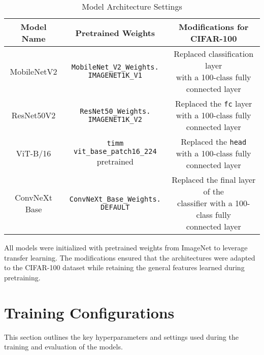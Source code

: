 \begin{table}[h]
    \centering
    \caption{Model Architecture Settings}
    \begin{tabular}{|c|c|c|}
    \hline
    \textbf{Model Name}   & \textbf{Pretrained Weights}            & \textbf{Modifications for CIFAR-100}                     \\ \hline
    MobileNetV2           & \makecell[l]{\texttt{MobileNet\_V2\_Weights.} \\ \texttt{IMAGENET1K\_V1}} 
                          & \makecell[l]{Replaced classification layer \\ with a 100-class fully connected layer} \\ \hline
    ResNet50V2            & \makecell[l]{\texttt{ResNet50\_Weights.} \\ \texttt{IMAGENET1K\_V2}} 
                          & \makecell[l]{Replaced the \texttt{fc} layer \\ with a 100-class fully connected layer} \\ \hline
    ViT-B/16              & \makecell[l]{\texttt{timm vit\_base\_patch16\_224} \\ pretrained} 
                          & \makecell[l]{Replaced the \texttt{head} \\ with a 100-class fully connected layer} \\ \hline
    ConvNeXt Base         & \makecell[l]{\texttt{ConvNeXt\_Base\_Weights.} \\ \texttt{DEFAULT}} 
                          & \makecell[l]{Replaced the final layer of the \\ classifier with a 100-class fully \\ connected layer} \\ \hline
    \end{tabular}
    \label{tab:model_settings}
\end{table}
    
    

All models were initialized with pretrained weights from ImageNet to leverage transfer learning. The modifications ensured that the architectures were adapted to the CIFAR-100 dataset while retaining the general features learned during pretraining.



\section{Training Configurations}
This section outlines the key hyperparameters and settings used during the training and evaluation of the models.

